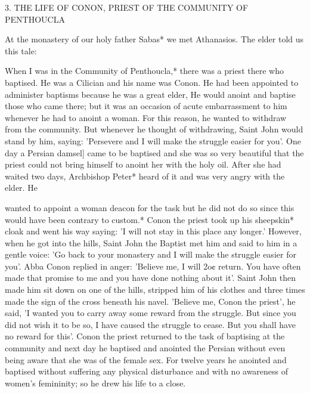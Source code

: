 3. THE LIFE OF CONON, PRIEST OF THE
COMMUNITY OF PENTHOUCLA

At the monastery of our holy father Sabas* we met Athanasios. The
elder told us this tale:

When I was in the Community of Penthoucla,* there was a priest
there who baptised. He was a Cilician and his name was Conon. He
had been appointed to administer baptisms because he was a great
elder, He would anoint and baptise those who came there; but it
was an occasion of acute embarrassment to him whenever he had to
anoint a woman. For this reason, he wanted to withdraw from the
community. But whenever he thought of withdrawing, Saint John
would stand by him, saying: 'Persevere and I will make the struggle
easier for you'. One day a Persian damsel] came to be baptised and
she was so very beautiful that the priest could not bring himself to
anoint her with the holy oil. After she had waited two days,
Archbishop Peter* heard of it and was very angry with the elder. He

wanted to appoint a woman deacon for the task but he did not do
so since this would have been contrary to custom.* Conon the priest
took up his sheepskin* cloak and went his way saying: 'I will not
stay in this place any longer.' However, when he got into the hills,
Saint John the Baptist met him and said to him in a gentle voice:
'Go back to your monastery and I will make the struggle easier for
you'. Abba Conon replied in anger: 'Believe me, I will 2o¢ return.
You have often made that promise to me and you have done
nothing about it'. Saint John then made him sit down on one of the
hills, stripped him of his clothes and three times made the sign of
the cross beneath his navel. 'Believe me, Conon the priest', he said,
'I wanted you to carry away some reward from the struggle. But
since you did not wish it to be so, I have caused the struggle to
cease. But you shall have no reward for this'. Conon the priest
returned to the task of baptising at the community and next day he
baptised and anointed the Persian without even being aware that she
was of the female sex. For twelve years he anointed and baptised
without suffering any physical disturbance and with no awareness
of women's femininity; so he drew his life to a close.

